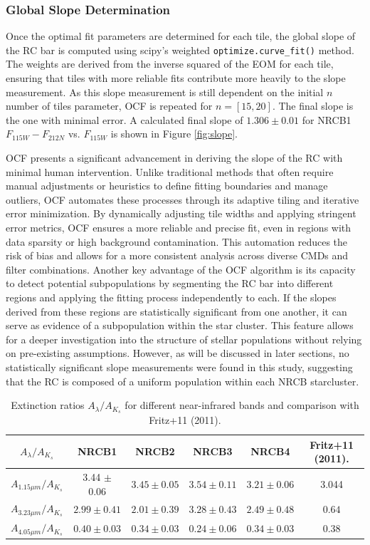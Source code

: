 \documentclass[twocolumn]{aastex631}
\begin{document}
\subsubsection{Global Slope Determination} 

Once the optimal fit parameters are determined for each tile, the global slope
of the RC bar is computed using scipy's weighted \verb|optimize.curve_fit()|
method. The weights are derived from the inverse squared of the EOM for each
tile, ensuring that tiles with more reliable fits contribute more heavily to
the  slope measurement. As this slope measurement is still dependent on the
initial $n$ number of tiles parameter, OCF is repeated for $n = [15, 20]$. The
final slope is the one with minimal error. A calculated final slope of $1.306
\pm 0.01$ for NRCB1 $F_{115W} - F_{212N}$ vs. $F_{115W}$ is shown in Figure \ref{fig:slope}.


OCF presents a significant advancement in deriving the slope of the RC with
minimal human intervention. Unlike traditional methods that often require
manual adjustments or heuristics to define fitting boundaries and manage
outliers, OCF automates these processes through its adaptive tiling and
iterative error minimization. By dynamically adjusting tile widths and applying
stringent error metrics, OCF ensures a more reliable and precise fit, even in
regions with data sparsity or high background contamination. This automation
reduces the risk of bias and allows for a more consistent analysis across
diverse CMDs and filter combinations. Another key advantage of the OCF
algorithm is its capacity to detect potential subpopulations by segmenting the
RC bar into different regions and applying the fitting process independently to
each. If the slopes derived from these regions are statistically significant
from one another, it can serve as evidence of a subpopulation within the star
cluster. This feature allows for a deeper investigation into the structure of
stellar populations without relying on pre-existing assumptions. However, as
will be discussed in later sections, no statistically significant slope
measurements were found in this study, suggesting that the RC is composed of
a uniform population within each NRCB starcluster.

\begin{table}[htb]
  \centering
  \begin{tabular}{c||c|c|c|c||c}
  $A_\lambda / A_{K_s}$ &  NRCB1 & NRCB2 & NRCB3 & NRCB4 & Fritz+11 (2011). \\
  \hline 
 $A_{1.15\mu m} / A_{K_s}$ & 3.44 $\pm$ 0.06 & $3.45 \pm 0.05$ & $3.54 \pm 0.11$ &  $3.21 \pm 0.06$ & 3.044 \\ 
 $A_{3.23 \mu m} / A_{K_s}$ & $2.99 \pm 0.41$ &  $2.01 \pm 0.39$ & $3.28 \pm 0.43$
                      & $2.49 \pm 0.48$ & $0.64$ \\ 
 $A_{4.05 \mu m} / A_{K_s}$ & $0.40 \pm 0.03$ &  $0.34 \pm 0.03$ &  $0.24\pm 0.06$

                      & $0.34 \pm 0.03$ & 0.38 
\end{tabular}
\caption{Extinction ratios $A_\lambda / A_{K_s}$ for different near-infrared bands and comparison with Fritz+11 (2011).}
\end{table}
\end{document}
